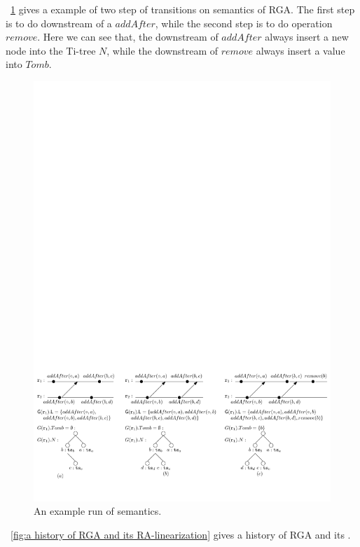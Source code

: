 \figurename~\ref{fig:an example run of semantics} gives a example of two step of transitions on semantics of RGA. The first step is to do downstream of a $addAfter$, while the second step is to do operation $remove$. Here we can see that, the downstream of $addAfter$ always insert a new node into the Ti-tree $N$, while the downstream of $remove$ always insert a value into $Tomb$.

\begin{figure}[t]
  \centering
  \includegraphics[width=0.9 \textwidth]{figures/ExplainSemantics.pdf}
\vspace{-10pt}
  \caption{An example run of semantics.}
  \label{fig:an example run of semantics}
\end{figure}


\figurename~\ref{fig:a history of RGA and its RA-linearization} gives a history of RGA and its \crdtlinearization{}.

